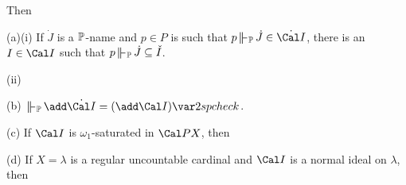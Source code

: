 
\noindent Then

(a)(i) If $\dot J$ is a $\Bbb P$-name and $p\in P$ is such that
$p\VVdP\,\dot J\in\dot{\Cal I}$, there is an $I\in\Cal I$ such that
$p\VVdP\,\dot J\subseteq\check I$.

\quad(ii)


(b) $\VVdP\,\add\dot{\Cal I}=(\add\Cal I)\var2spcheck$.

(c) If $\Cal I$ is $\omega_1$-saturated in $\Cal PX$, then


(d) If $X=\lambda$ is a regular uncountable
cardinal and $\Cal I$ is a normal ideal on $\lambda$, then



